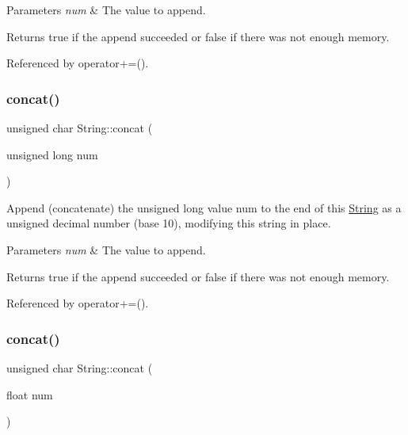 \begin{DoxyParams}{Parameters}
{\em num} & The value to append.\\
\hline
\end{DoxyParams}
\begin{DoxyReturn}{Returns}
true if the append succeeded or false if there was not enough memory. 
\end{DoxyReturn}


Referenced by operator+=().

\mbox{\label{class_string_ad502777b7549182fe9b1a14879acf307}} 
\subsubsection{\texorpdfstring{concat()}{concat()}\hspace{0.1cm}{\footnotesize\ttfamily [9/12]}}
{\footnotesize\ttfamily unsigned char String\+::concat (\begin{DoxyParamCaption}\item[{unsigned long}]{num }\end{DoxyParamCaption})}



Append (concatenate) the unsigned long value num to the end of this \hyperlink{class_string}{String} as a unsigned decimal number (base 10), modifying this string in place. 


\begin{DoxyParams}{Parameters}
{\em num} & The value to append.\\
\hline
\end{DoxyParams}
\begin{DoxyReturn}{Returns}
true if the append succeeded or false if there was not enough memory. 
\end{DoxyReturn}


Referenced by operator+=().

\mbox{\label{class_string_af6029b556adb9a23d82d1f276ce4f8ee}} 
\subsubsection{\texorpdfstring{concat()}{concat()}\hspace{0.1cm}{\footnotesize\ttfamily [10/12]}}
{\footnotesize\ttfamily unsigned char String\+::concat (\begin{DoxyParamCaption}\item[{float}]{num }\end{DoxyParamCaption})}



